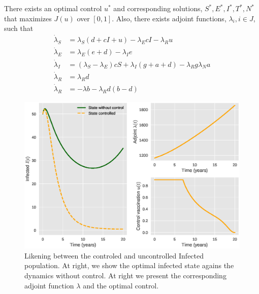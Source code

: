 \begin{theorem} 
    There exists an optimal control $u^{*}$ and corresponding solutions, \break
    $S^{*}, E^{*}, I^{*}, T^{*}, N^{*}$ that maximizes $J(u)$ over $[0, 1]$. 
    Also, there exists adjoint functions, $\lambda_{i}, i \in J$, such that
    \begin{align*}
         \dot{\lambda}_{S} &=
            \lambda_{S}\left(d + cI + u \right) - \lambda_{E}cI - 
            \lambda_{R}u   \\
        \dot{\lambda}_{E} &=
            \lambda_{E}(e + d) - \lambda_{I}e  \\
        \dot{\lambda}_{I} &=
            (\lambda_{S} - \lambda_{E})cS + \lambda_{I}(g + a +d) - \lambda_{R}g
            \lambda_{N}a\\
        \dot{\lambda}_{R} &=    \lambda_{R}d  \\
        \dot{\lambda}_{R} &=
            - \lambda b - \lambda_{R}d  (b - d)
    \end{align*}
\end{theorem}


\begin{figure}[tbh!]
\centering
	\includegraphics[width=0.7\linewidth]{./Figures/epidemics_lenhart_lab7}
	\caption{Likening between the controled and uncontrolled Infected 
	 population.  At right, we show the optimal infected state agains the 
	 dynamics without 
	 control. At right we present the corresponding adjoint function $\lambda$ 
	 and the optimal control.}
\label{fig:epidemicslenhartlab7}
\end{figure}
